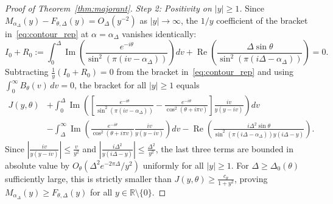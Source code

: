 \documentclass[11pt,a4paper]{amsart}
\theoremstyle{remark}
\numberwithin{equation}{section}
\newcommand{\R}{\mathbb{R}}
\begin{document}
\begin{proof}[Proof of Theorem~\ref{thm:majorant}]
\emph{Step 2: Positivity on $|y| \ge 1$.} Since $M_{\alpha_\Delta}(y) - F_{\theta,\Delta}(y) = O_\Delta(y^{-2})$ as $|y|\to\infty$, the $1/y$ coefficient of the bracket in~\eqref{eq:contour_rep} at $\alpha = \alpha_\Delta$ vanishes identically:
\[
  I_0 + R_0 := \int_0^\Delta \operatorname{Im}\!\left(\frac{e^{-i\theta}}{\sin^2(\pi(iv-\alpha_\Delta))}\right)dv + \operatorname{Re}\!\left(\frac{\Delta\sin\theta}{\sin^2(\pi(i\Delta-\alpha_\Delta))}\right) = 0.
\]
Subtracting $\frac{1}{y}(I_0+R_0) = 0$ from the bracket in~\eqref{eq:contour_rep} and using $\int_0^\infty B_\theta(v)\,dv = 0$, the bracket for all $|y| \ge 1$ equals
\begin{align*}
  J(y,\theta) &+ \int_0^\Delta \operatorname{Im}\!\left(\left[\frac{e^{-i\theta}}{\sin^2(\pi(iv-\alpha_\Delta))} - \frac{e^{-i\theta}}{\cos^2(\theta+i\pi v)}\right]\frac{iv}{y(y-iv)}\right)dv \\
  &- \int_\Delta^\infty \operatorname{Im}\!\left(\frac{e^{-i\theta}}{\cos^2(\theta+i\pi v)}\frac{iv}{y(y-iv)}\right)dv - \operatorname{Re}\!\left(\frac{i\Delta^2\sin\theta}{\sin^2(\pi(i\Delta-\alpha_\Delta))y(i\Delta-y)}\right).
\end{align*}
Since $|\frac{iv}{y(y-iv)}| \le \frac{v}{y^2}$ and $|\frac{i\Delta^2}{y(i\Delta-y)}| \le \frac{\Delta^2}{y^2}$, the last three terms are bounded in absolute value by $O_\theta(\Delta^2 e^{-2\pi\Delta}/y^2)$ uniformly for all $|y| \ge 1$. For $\Delta \ge \Delta_0(\theta)$ sufficiently large, this is strictly smaller than $J(y,\theta) \ge \frac{c_\theta}{1+y^2}$, proving $M_{\alpha_\Delta}(y) \ge F_{\theta,\Delta}(y)$ for all $y \in \R\setminus\{0\}$.


\end{proof}
\end{document}

